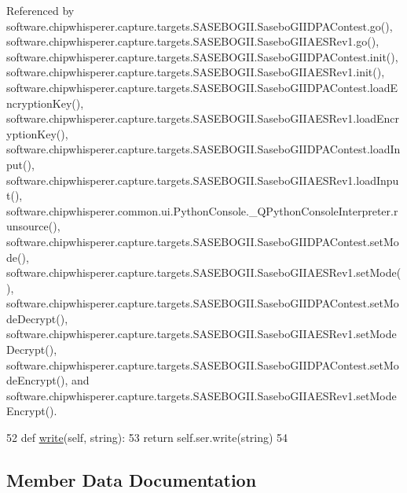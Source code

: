 Referenced by software.\+chipwhisperer.\+capture.\+targets.\+S\+A\+S\+E\+B\+O\+G\+I\+I.\+Sasebo\+G\+I\+I\+D\+P\+A\+Contest.\+go(), software.\+chipwhisperer.\+capture.\+targets.\+S\+A\+S\+E\+B\+O\+G\+I\+I.\+Sasebo\+G\+I\+I\+A\+E\+S\+Rev1.\+go(), software.\+chipwhisperer.\+capture.\+targets.\+S\+A\+S\+E\+B\+O\+G\+I\+I.\+Sasebo\+G\+I\+I\+D\+P\+A\+Contest.\+init(), software.\+chipwhisperer.\+capture.\+targets.\+S\+A\+S\+E\+B\+O\+G\+I\+I.\+Sasebo\+G\+I\+I\+A\+E\+S\+Rev1.\+init(), software.\+chipwhisperer.\+capture.\+targets.\+S\+A\+S\+E\+B\+O\+G\+I\+I.\+Sasebo\+G\+I\+I\+D\+P\+A\+Contest.\+load\+Encryption\+Key(), software.\+chipwhisperer.\+capture.\+targets.\+S\+A\+S\+E\+B\+O\+G\+I\+I.\+Sasebo\+G\+I\+I\+A\+E\+S\+Rev1.\+load\+Encryption\+Key(), software.\+chipwhisperer.\+capture.\+targets.\+S\+A\+S\+E\+B\+O\+G\+I\+I.\+Sasebo\+G\+I\+I\+D\+P\+A\+Contest.\+load\+Input(), software.\+chipwhisperer.\+capture.\+targets.\+S\+A\+S\+E\+B\+O\+G\+I\+I.\+Sasebo\+G\+I\+I\+A\+E\+S\+Rev1.\+load\+Input(), software.\+chipwhisperer.\+common.\+ui.\+Python\+Console.\+\_\+\+Q\+Python\+Console\+Interpreter.\+runsource(), software.\+chipwhisperer.\+capture.\+targets.\+S\+A\+S\+E\+B\+O\+G\+I\+I.\+Sasebo\+G\+I\+I\+D\+P\+A\+Contest.\+set\+Mode(), software.\+chipwhisperer.\+capture.\+targets.\+S\+A\+S\+E\+B\+O\+G\+I\+I.\+Sasebo\+G\+I\+I\+A\+E\+S\+Rev1.\+set\+Mode(), software.\+chipwhisperer.\+capture.\+targets.\+S\+A\+S\+E\+B\+O\+G\+I\+I.\+Sasebo\+G\+I\+I\+D\+P\+A\+Contest.\+set\+Mode\+Decrypt(), software.\+chipwhisperer.\+capture.\+targets.\+S\+A\+S\+E\+B\+O\+G\+I\+I.\+Sasebo\+G\+I\+I\+A\+E\+S\+Rev1.\+set\+Mode\+Decrypt(), software.\+chipwhisperer.\+capture.\+targets.\+S\+A\+S\+E\+B\+O\+G\+I\+I.\+Sasebo\+G\+I\+I\+D\+P\+A\+Contest.\+set\+Mode\+Encrypt(), and software.\+chipwhisperer.\+capture.\+targets.\+S\+A\+S\+E\+B\+O\+G\+I\+I.\+Sasebo\+G\+I\+I\+A\+E\+S\+Rev1.\+set\+Mode\+Encrypt().


\begin{DoxyCode}
52     \textcolor{keyword}{def }\hyperlink{classsoftware_1_1chipwhisperer_1_1capture_1_1targets_1_1smartcard__readers_1_1system__ser_1_1ReaderSystemSER_ab1f427c96238f7553810d862b74caea1}{write}(self, string):
53         \textcolor{keywordflow}{return} self.ser.write(string)
54 
\end{DoxyCode}


\subsection{Member Data Documentation}
\hypertarget{classsoftware_1_1chipwhisperer_1_1capture_1_1targets_1_1smartcard__readers_1_1system__ser_1_1ReaderSystemSER_ac0c204ad36bbc68b8daca000ea544c86}{}
